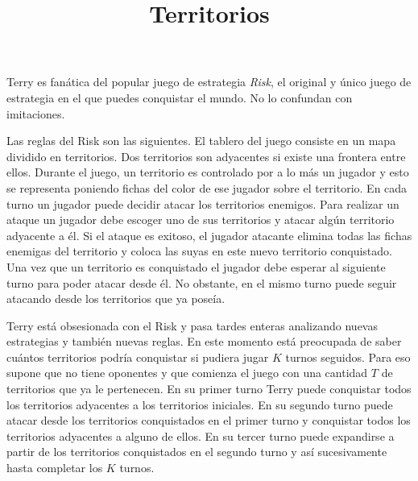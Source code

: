 \documentclass{oci}
\title{Territorios}
\begin{document}
\begin{problemDescription}
%

  Terry es fanática del popular juego de estrategia \emph{Risk}, el original 
  y único juego de estrategia en el que puedes conquistar el mundo. No lo confundan con imitaciones.

  Las reglas del Risk son las siguientes.
  El tablero del juego consiste en un mapa dividido en territorios.
  Dos territorios son adyacentes si existe una frontera entre ellos. 
  Durante el juego, un territorio es controlado por a lo más un jugador %
  y esto se representa poniendo %
  fichas del color de ese jugador sobre el territorio. 
  En cada turno un jugador puede decidir atacar los territorios enemigos.
  Para realizar un ataque un jugador debe escoger uno de sus territorios y
  atacar algún territorio adyacente a él.
  Si el ataque es exitoso, el jugador atacante elimina todas las fichas enemigas
  del territorio y coloca las suyas en este nuevo territorio conquistado.
  Una vez que un territorio es conquistado el jugador debe esperar al siguiente
  turno para poder atacar desde él.
  No obstante, en el mismo turno puede seguir atacando desde los territorios que ya poseía.

  Terry está obsesionada con el Risk y pasa tardes enteras analizando
  nuevas estrategias y también nuevas reglas.
  En este momento está preocupada de saber cuántos territorios podría
  conquistar si pudiera jugar $K$ turnos seguidos.
  Para eso supone que no tiene oponentes y que comienza el juego con una cantidad $T$ de territorios
  que ya le pertenecen.
  En su primer turno Terry puede conquistar todos los territorios adyacentes a
  los territorios iniciales.
  En su segundo turno puede atacar desde los territorios conquistados en
  el primer turno y conquistar todos los territorios adyacentes a alguno de
  ellos.
  En su tercer turno puede expandirse a partir de los territorios
  conquistados en el segundo turno y así sucesivamente hasta completar los $K$
  turnos.
  

\end{problemDescription}
\end{document}
